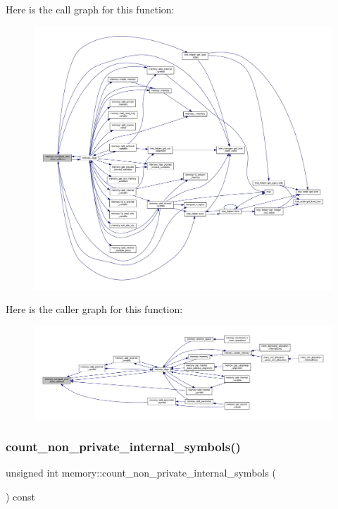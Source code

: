 Here is the call graph for this function\+:
\nopagebreak
\begin{figure}[H]
\begin{center}
\leavevmode
\includegraphics[width=350pt]{d8/d99/classmemory_aaa68bc383457b382d8fdac9d29d74def_cgraph}
\end{center}
\end{figure}
Here is the caller graph for this function\+:
\nopagebreak
\begin{figure}[H]
\begin{center}
\leavevmode
\includegraphics[width=350pt]{d8/d99/classmemory_aaa68bc383457b382d8fdac9d29d74def_icgraph}
\end{center}
\end{figure}
\mbox{\label{classmemory_a65a07e87ed6884cc67998454ed50fb72}} 
\subsubsection{\texorpdfstring{count\+\_\+non\+\_\+private\+\_\+internal\+\_\+symbols()}{count\_non\_private\_internal\_symbols()}}
{\footnotesize\ttfamily unsigned int memory\+::count\+\_\+non\+\_\+private\+\_\+internal\+\_\+symbols (\begin{DoxyParamCaption}{ }\end{DoxyParamCaption}) const}

